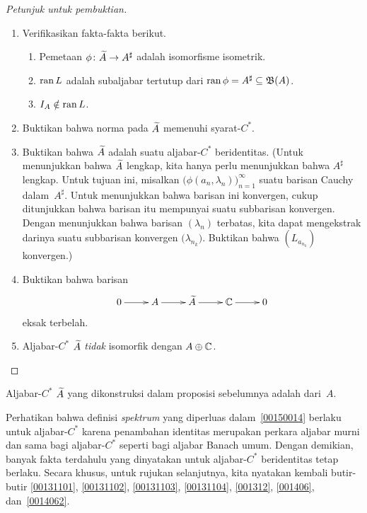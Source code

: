 \begin{proof}[\emph{Petunjuk untuk pembuktian}]
\begin{enumerate}
    \item Verifikasikan fakta-fakta berikut.
      \begin{enumerate}
        \item Pemetaan $\phi\colon \widetilde{A} \rightarrow A^\sharp$ adalah isomorfisme isometrik.
        \item $\operatorname{ran} L$ adalah subaljabar tertutup dari
$\operatorname{ran} \phi = A^\sharp \subseteq \mathfrak{B}(A)$.
        \item $I_A \notin \operatorname{ran} L$.
      \end{enumerate}
    \item Buktikan bahwa norma pada $\widetilde{A}$ memenuhi syarat-$C^*$.
    \item Buktikan bahwa $\widetilde{A}$ adalah suatu aljabar-$C^*$ beridentitas. (Untuk
menunjukkan bahwa $\widetilde{A}$ lengkap, kita hanya perlu menunjukkan bahwa $A^\sharp$ lengkap.
Untuk tujuan ini, misalkan $\bigl(\phi(a_n,\lambda_n)\bigr)_{n=1}^\infty$ suatu barisan
Cauchy dalam~$A^\sharp$. Untuk menunjukkan bahwa barisan ini konvergen, cukup ditunjukkan
bahwa barisan itu mempunyai suatu subbarisan konvergen. Dengan menunjukkan bahwa barisan
$(\lambda_n)$ terbatas, kita dapat mengekstrak darinya suatu subbarisan konvergen
$\bigl(\lambda_{n_k}\bigr)$. Buktikan bahwa $(L_{a_{n_k}})$ konvergen.)
    \item Buktikan bahwa barisan
        \begin{equation}\xymatrix{
     0\ar[r] & A\ar[r] & \wt A\ar[r] & \C\ar[r] & 0
        }\end{equation}
eksak terbelah.
    \item Aljabar-$C^*$ $\widetilde{A}$ \emph{tidak} isomorfik dengan $A \oplus \mathbb{C}$.
\end{enumerate}  \ns
\end{proof}

\begin{defn}\label{00152131} Aljabar-$C^*$ $\widetilde{A}$ yang dikonstruksi dalam proposisi
sebelumnya adalah
 dari~$A$.
\end{defn}

Perhatikan bahwa definisi \emph{spektrum} yang diperluas dalam~\ref{00150014} berlaku untuk
aljabar-$C^*$ karena penambahan identitas merupakan perkara aljabar murni dan sama
bagi aljabar-$C^*$ seperti bagi aljabar Banach umum. Dengan demikian, banyak fakta
terdahulu yang dinyatakan untuk aljabar-$C^*$ beridentitas tetap berlaku. Secara khusus,
untuk rujukan selanjutnya, kita nyatakan kembali butir-butir \ref{00131101},
\ref{00131102}, \ref{00131103}, \ref{00131104}, \ref{001312}, \ref{001406},
dan~\ref{0014062}.

